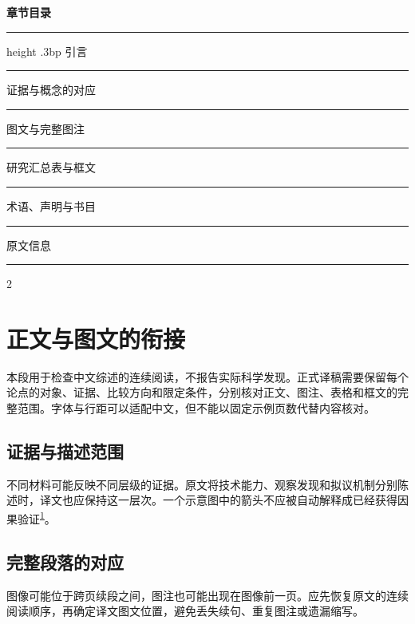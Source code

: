\documentclass[UTF8,fontset=none,scheme=plain]{ctexart}
\renewcommand{\normalsize}{\fontsize{9.05bp}{12.1bp}\selectfont}
\newcommand{\NRCite}[1]{\textsuperscript{\hyperlink{ref:#1}{#1}}}
\newenvironment{NRColumns}{\begin{multicols}{2}\normalsize}{\end{multicols}}
\newcommand{\NeutralParagraph}{本段用于检查中文综述的连续阅读，不报告实际科学发现。正式译稿需要保留每个论点的对象、证据、比较方向和限定条件，分别核对正文、图注、表格和框文的完整范围。字体与行距可以适配中文，但不能以固定示例页数代替内容核对。\par}
\begin{document}
\begin{minipage}[t][519bp][t]{122.0bp}\vspace{0pt}\sffamily\fontsize{8.6bp}{11.5bp}\selectfont
{\bfseries\fontsize{10bp}{12bp}\selectfont 章节目录\par}\vspace{17bp}\hrule height .3bp\vspace{5bp}
引言\par\vspace{5bp}\hrule\vspace{5bp}
证据与概念的对应\par\vspace{5bp}\hrule\vspace{5bp}
图文与完整图注\par\vspace{5bp}\hrule\vspace{5bp}
研究汇总表与框文\par\vspace{5bp}\hrule\vspace{5bp}
术语、声明与书目\par\vspace{5bp}\hrule\vspace{5bp}
原文信息\par\vspace{5bp}\hrule
\end{minipage}
\clearpage
\begin{NRColumns}
\section*{正文与图文的衔接}
\NeutralParagraph
\subsection*{证据与描述范围}
不同材料可能反映不同层级的证据。原文将技术能力、观察发现和拟议机制分别陈述时，译文也应保持这一层次。一个示意图中的箭头不应被自动解释成已经获得因果验证\NRCite{1}。\par
\subsection*{完整段落的对应}
图像可能位于跨页续段之间，图注也可能出现在图像前一页。应先恢复原文的连续阅读顺序，再确定译文图文位置，避免丢失续句、重复图注或遗漏缩写。
\end{NRColumns}
\end{document}
